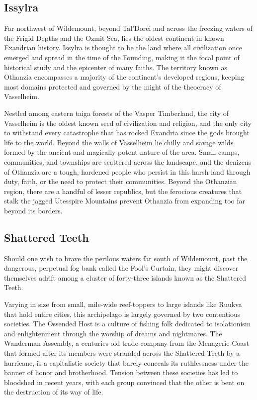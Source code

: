\documentclass[10pt,a4paper,twoside,bg=print,twocolumn,openany,nodeprecatedcode]{dndbook}
\begin{document}
\subsection{Issylra}
Far northwest of Wildemount, beyond Tal'Dorei and across the freezing waters of the Frigid Depths and the Ozmit Sea, lies the oldest continent in known Exandrian history. Issylra is thought to be the land where all civilization once emerged and spread in the time of the Founding, making it the focal point of historical study and the epicenter of many faiths. The territory known as Othanzia encompasses a majority of the continent's developed regions, keeping most domains protected and governed by the might of the theocracy of Vasselheim.

Nestled among eastern taiga forests of the Vasper Timberland, the city of Vasselheim is the oldest known seed of civilization and religion, and the only city to withstand every catastrophe that has rocked Exandria since the gods brought life to the world. Beyond the walls of Vasselheim lie chilly and savage wilds formed by the ancient and magically potent nature of the area. Small camps, communities, and townships are scattered across the landscape, and the denizens of Othanzia are a tough, hardened people who persist in this harsh land through duty, faith, or the need to protect their communities. Beyond the Othanzian region, there are a handful of lesser republics, but the ferocious creatures that stalk the jagged Utesspire Mountains prevent Othanzia from expanding too far beyond its borders.

\subsection{Shattered Teeth}
Should one wish to brave the perilous waters far south of Wildemount, past the dangerous, perpetual fog bank called the Fool's Curtain, they might discover themselves adrift among a cluster of forty-three islands known as the Shattered Teeth.

Varying in size from small, mile-wide reef-toppers to large islands like Ruukva that hold entire cities, this archipelago is largely governed by two contentious societies. The Ossended Host is a culture of fishing folk dedicated to isolationism and enlightenment through the worship of dreams and nightmares. The Wanderman Assembly, a centuries-old trade company from the Menagerie Coast that formed after its members were stranded across the Shattered Teeth by a hurricane, is a capitalistic society that barely conceals its ruthlessness under the banner of honor and brotherhood. Tension between these societies has led to bloodshed in recent years, with each group convinced that the other is bent on the destruction of its way of life.
\end{document}
